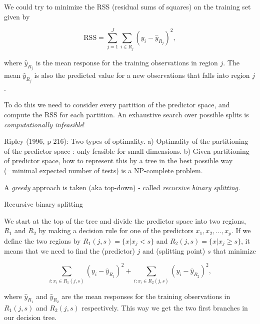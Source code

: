 \documentclass[10pt,ignorenonframetext,]{beamer}
\begin{document}
\begin{frame}

We could try to minimize the RSS (residual sums of squares) on the
training set given by

\[
\text{RSS}=\sum_{j=1}^J \sum_{i \in R_j}(y_i-\hat{y}_{R_j})^2,
\]

where \(\hat{y}_{R_j}\) is the mean response for the training
observations in region \(j\). The mean \(\hat{y}_{R_j}\) is also the
predicted value for a new observations that falls into region \(j\).

To do this we need to consider every partition of the predictor space,
and compute the RSS for each partition. An exhaustive search over
possible splits is \emph{computationally infeasible}!

\end{frame}

\begin{frame}

Ripley (1996, p 216): Two types of optimality. a) Optimality of the
partitioning of the predictor space : only feasible for small
dimensions. b) Given partitioning of predictor space, how to represent
this by a tree in the best possible way (=minimal expected number of
tests) is a NP-complete problem.

A \emph{greedy} approach is taken (aka top-down) - called
\emph{recursive binary splitting.}

\end{frame}

\begin{frame}

\begin{block}{Recursive binary splitting}

We start at the top of the tree and divide the predictor space into two
regions, \(R_1\) and \(R_2\) by making a decision rule for one of the
predictors \(x_1, x_2,...,x_p\). If we define the two regions by
\(R_1(j,s)=\{x|x_j<s\}\) and \(R_2(j,s)=\{x|x_j\geq s\}\), it means that
we need to find the (predictor) \(j\) and (splitting point) \(s\) that
minimize

\[\sum_{i: x_i \in R_1(j,s)}(y_i-\hat{y}_{R_1})^2+\sum_{i: x_i \in R_2(j,s)}(y_i -\hat{y}_{R_2})^2,\]

where \(\hat{y}_{R_1}\) and \(\hat{y}_{R_2}\) are the mean responses for
the training observations in \(R_1(j,s)\) and \(R_2(j,s)\) respectively.
This way we get the two first branches in our decision tree.

\end{block}

\end{frame}
\end{document}
